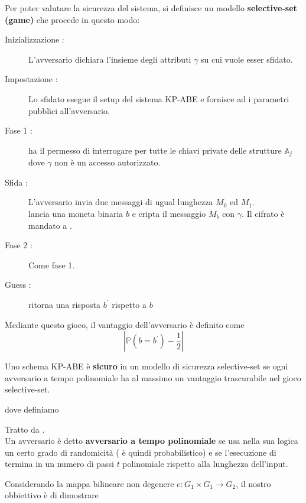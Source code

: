 \vspace{0.8cm}

Per poter valutare la sicurezza del sistema, si definisce un modello \textbf{selective-set (game)} che procede in questo modo:
\begin{description}
\item[Inizializzazione :] L'avversario  dichiara l'insieme degli attributi $\gamma$ su cui vuole esser sfidato.
\item[Impostazione :] Lo sfidato  esegue il setup del sistema KP-ABE e fornisce ad  i parametri pubblici all'avversario.
\item[Fase 1 :]  ha il permesso di interrogare  per tutte le chiavi private delle strutture $\mathbb{A}_j$ dove $\gamma$ non è un accesso autorizzato.
\item[Sfida :] L'avversario  invia due messaggi di ugual lunghezza $M_0$ ed $M_1$.\\
 lancia una moneta binaria $b$ e cripta il messaggio $M_b$ con $\gamma$. Il cifrato è mandato a .
\item[Fase 2 :] Come fase 1.
\item[Guess :]  ritorna una risposta $b^\prime$ rispetto a $b$
\end{description}

Mediante questo gioco, il vantaggio dell'avversario  è definito come \[\left\lvert \mathbb{P}(b = b^\prime) - \frac{1}{2}\right\rvert\]

\begin{defi}
Uno schema KP-ABE è \textbf{sicuro} in un modello di sicurezza selective-set se ogni avversario a tempo polinomiale ha al massimo un vantaggio trascurabile nel gioco selective-set.
\end{defi}

dove definiamo
\begin{defi}
Tratto da \cite[Def~1.2]{crittoalice}.\\
Un avversario  è detto \textbf{avversario a tempo polinomiale} se usa nella sua logica un certo grado di randomicità ( è quindi probabilistico) e se l'esecuzione di  termina in un numero di passi $t$ polinomiale rispetto alla lunghezza dell'input. 
\end{defi}

\vspace{0.5cm}
Considerando la mappa bilineare non degenere $e:G_1 \times G_1 \rightarrow G_2$, il nostro obbiettivo è di dimostrare


